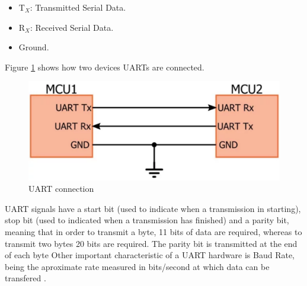 	\begin{itemize}
		\item T$_{X}$: Transmitted Serial Data.
		\item R$_{X}$: Received Serial Data.
		\item Ground.
	\end{itemize}

	Figure \ref{fig:uart-connection} shows how two devices UARTs are connected.

		\begin{figure}[htbp]
			\centering
				\includegraphics[scale=0.8]{figuras/fig-uart-connection}
			\caption{UART connection \cite{uart-connection}}
			\label{fig:uart-connection}
		\end{figure}	

	UART signals have a start bit (used to indicate when a transmission in starting), stop bit (used to indicated when a transmission has finished) and a parity bit, meaning that in order to transmit a byte, 11 bits of data are required, whereas to transmit two bytes 20 bits are required. The parity bit is transmitted at the end of each byte Other important characteristic of a UART hardware is Baud Rate, being the aproximate rate measured in bits/second at which data can be transfered \cite{keimUart2016}.
